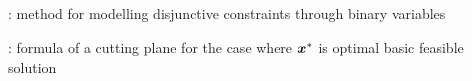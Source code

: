\subsection*{}
\item {}: method for modelling disjunctive constraints through binary variables
\item {}: formula of a cutting plane for the case where \(\bm{x}^{*}\) is optimal basic feasible solution
